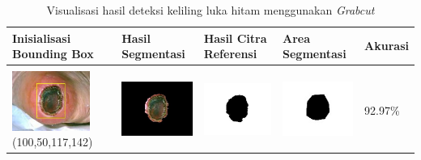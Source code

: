 \begin{table}[H]
	\centering
	\caption{Visualisasi hasil deteksi keliling luka hitam menggunakan \emph{Grabcut}}
	\label{tabel_hasil_2}
	\begin{tabular}{|m{1.0in}|m{1.0in}|m{1.0in}|m{1.0in}|m{0.6in}|}
		\hline
		\textbf{Inisialisasi Bounding Box} & \textbf{Hasil Segmentasi} & \textbf{Hasil Citra Referensi} & \textbf{Area Segmentasi} & \textbf{Akurasi} \\
		\hline

		&  &  & \\
		\includegraphics[width=1.0in]{gambar/hasil_segmentasi/luka_hitam/image_7_rect.jpg} {\centering\fontsize{10}{10}\selectfont(100,50,117,142)}&
		\includegraphics[width=1.0in]{gambar/hasil_segmentasi/luka_hitam/result_7.jpg}&
		\includegraphics[width=1.0in]{gambar/hasil_segmentasi/luka_hitam/mask_r_7.jpg}&
		\includegraphics[width=1.0in]{gambar/hasil_segmentasi/luka_hitam/7_r.jpg}&
		92.97\% \\
		\hline
		

\end{tabular}
\end{table}
